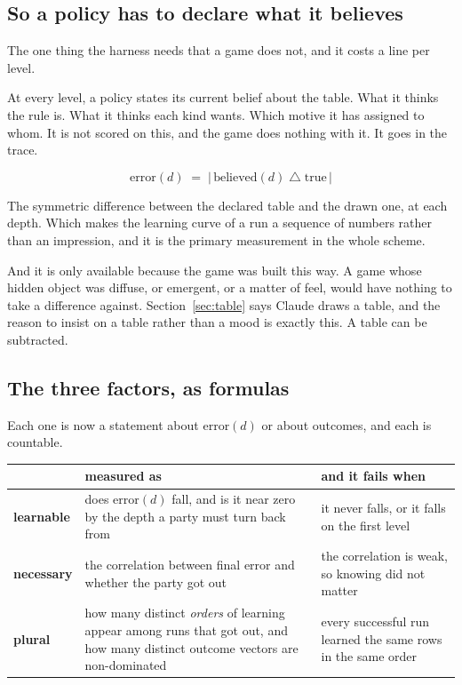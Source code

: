 \documentclass[11pt,a4paper]{article}
\begin{document}
\subsection{So a policy has to declare what it believes}

The one thing the harness needs that a game does not, and it costs a line per level.

At every level, a policy states its current belief about the table. What it thinks the rule is. What
it thinks each kind wants. Which motive it has assigned to whom. It is not scored on this, and the
game does nothing with it. It goes in the trace.

\[ \text{error}(d) \;=\; \bigl|\, \text{believed}(d) \;\triangle\; \text{true} \,\bigr| \]

The symmetric difference between the declared table and the drawn one, at each depth. Which makes
the learning curve of a run a sequence of numbers rather than an impression, and it is the primary
measurement in the whole scheme.

\begin{sectionbox}
And it is only available because the game was built this way. A game whose hidden object was
diffuse, or emergent, or a matter of feel, would have nothing to take a difference against.
Section~\ref{sec:table} says Claude draws a table, and the reason to insist on a table rather than a
mood is exactly this. A table can be subtracted.
\end{sectionbox}

\subsection{The three factors, as formulas}

Each one is now a statement about $\text{error}(d)$ or about outcomes, and each is countable.

\begin{center}
\begin{tabular}{@{}l@{\hspace{3mm}}>{\raggedright\arraybackslash}p{}@{\hspace{3mm}}>{\raggedright\arraybackslash}p{}@{}}
\toprule
& \textbf{measured as} & \textbf{and it fails when} \\
\midrule
\textbf{learnable} &
does $\text{error}(d)$ fall, and is it near zero by the depth a party must turn back from &
it never falls, or it falls on the first level \\[1mm]
\textbf{necessary} &
the correlation between final $\text{error}$ and whether the party got out &
the correlation is weak, so knowing did not matter \\[1mm]
\textbf{plural} &
how many distinct \emph{orders} of learning appear among runs that got out, and how many distinct
outcome vectors are non-dominated &
every successful run learned the same rows in the same order \\
\bottomrule
\end{tabular}
\end{center}
\end{document}
